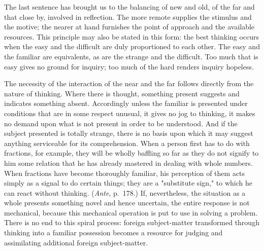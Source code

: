 \documentclass[letterpaper]{book}
\begin{document}
The last sentence has brought us to the balancing of new and old, of the
far and that close by, involved in reflection. The more remote supplies
the stimulus and the motive; the nearer at hand furnishes the point of
approach and the available resources. This principle may also be stated
in this form: the best thinking occurs when the easy and the difficult
are duly proportioned to each other. The easy and the familiar are
equivalents, as are the strange and the difficult. Too much that is easy
gives no ground for inquiry; too much of the hard renders inquiry
hopeless.


The necessity of the interaction of the near and the far follows
directly from the nature of thinking. Where there is thought, something
present suggests and indicates something absent. Accordingly unless the
familiar
is presented under conditions that are in some respect unusual, it gives
no jog to thinking, it makes no demand upon what is not present in order
to be understood. And if the subject presented is totally strange, there
is no basis upon which it may suggest anything serviceable for its
comprehension. When a person first has to do with fractions, for
example, they will be wholly baffling so far as they do not signify to
him some relation that he has already mastered in dealing with whole
numbers. When fractions have become thoroughly familiar, his perception
of them acts simply as a signal to do certain things; they are a
"substitute sign," to which he can react without thinking. (\emph{Ante},
p.\ 178.) If, nevertheless, the situation as a whole presents something
novel and hence uncertain, the entire response is not mechanical,
because this mechanical operation is put to use in solving a problem.
There is no end to this spiral process: foreign subject-matter
transformed through thinking into a familiar possession becomes a
resource for judging and assimilating additional foreign subject-matter.

\end{document}
